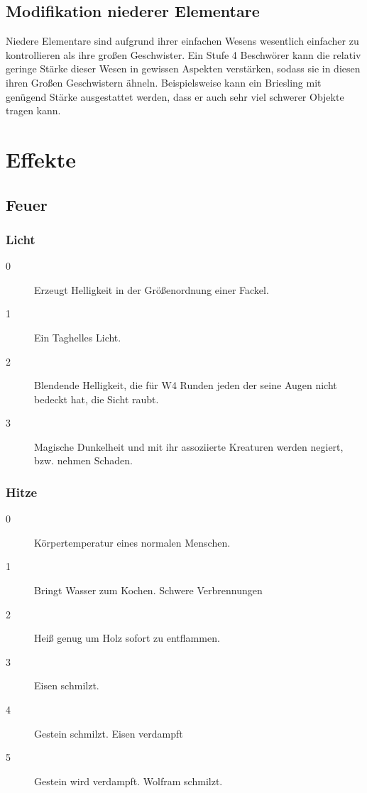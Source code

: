 \documentclass[a4paper,12pt,oneside]{book}
\begin{document}
\chapter{Modifikation niederer Elementare}
Niedere Elementare sind aufgrund ihrer einfachen Wesens wesentlich einfacher zu kontrollieren als ihre großen Geschwister. Ein Stufe 4 Beschwörer kann die relativ geringe Stärke dieser Wesen in gewissen Aspekten verstärken, sodass sie in diesen ihren Großen Geschwistern ähneln. Beispielsweise kann ein Briesling mit genügend Stärke ausgestattet werden, dass er auch sehr viel schwerer Objekte tragen kann.

\part{Effekte}

\chapter{Feuer}
\section{Licht}
\begin{description}
\item[0] Erzeugt Helligkeit in der Größenordnung einer Fackel.
\item[1] Ein Taghelles Licht.
\item[2] Blendende Helligkeit, die für W4 Runden jeden der seine Augen nicht bedeckt hat, die Sicht raubt.
\item[3] Magische Dunkelheit und mit ihr assoziierte Kreaturen werden negiert, bzw. nehmen Schaden.     
\end{description}
\section{Hitze}
\begin{description}
\item[0] Körpertemperatur eines normalen Menschen.
\item[1] Bringt Wasser zum Kochen. Schwere Verbrennungen
\item[2] Heiß genug um Holz sofort zu entflammen.
\item[3] Eisen schmilzt.
\item[4] Gestein schmilzt. Eisen verdampft
\item[5] Gestein wird verdampft. Wolfram schmilzt.
\end{description}
\end{document}
